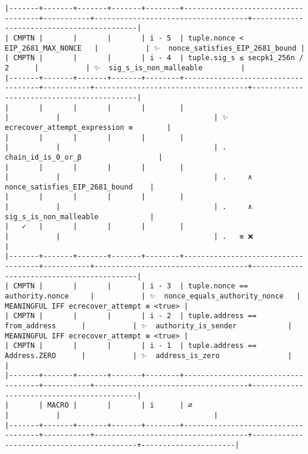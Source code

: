 \documentclass[varwidth=\maxdimen,margin=0.5cm,multi={verbatim}]{standalone}
\begin{document}
\begin{verbatim}
|-------+-------+-------+-------+--------+------------------------------------+-----------+------------------------------------+-------------------------------------------|
| CMPTN |       |       |       | i - 5  | tuple.nonce < EIP_2681_MAX_NONCE   |           | ✨  nonce_satisfies_EIP_2681_bound |
| CMPTN |       |       |       | i - 4  | tuple.sig_s ≤ secpk1_256n / 2      |           | ✨  sig_s_is_non_malleable         |
|-------+-------+-------+-------+--------+------------------------------------+-----------+------------------------------------+-------------------------------------------|
|       |       |       |       |        |                                    |           |                                    | ✨  ecrecover_attempt_expression ≡        |
|       |       |       |       |        |                                    |           |                                    | .     chain_id_is_0_or_β                  |
|       |       |       |       |        |                                    |           |                                    | .     ∧ nonce_satisfies_EIP_2681_bound    |
|       |       |       |       |        |                                    |           |                                    | .     ∧ sig_s_is_non_malleable            |
|   ✓   |       |       |       |        |                                    |           |                                    | .   ≡ ❌                                  |
|-------+-------+-------+-------+--------+------------------------------------+-----------+------------------------------------+-------------------------------------------|
| CMPTN |       |       |       | i - 3  | tuple.nonce == authority.nonce     |           | ✨  nonce_equals_authority_nonce   | MEANINGFUL IFF ecrecover_attempt ≡ <true> |
| CMPTN |       |       |       | i - 2  | tuple.address == from_address      |           | ✨  authority_is_sender            | MEANINGFUL IFF ecrecover_attempt ≡ <true> |
| CMPTN |       |       |       | i - 1  | tuple.address == Address.ZERO      |           | ✨  address_is_zero                |                                           |
|-------+-------+-------+-------+--------+------------------------------------+-----------+------------------------------------+-------------------------------------------|
|       | MACRO |       |       | i      | ∅                                  |           |                                    |
|-------+-------+-------+-------+--------+------------------------------------+-----------+------------------------------------+-------------------------------------------+----------------------|

\end{verbatim}
\end{document}
